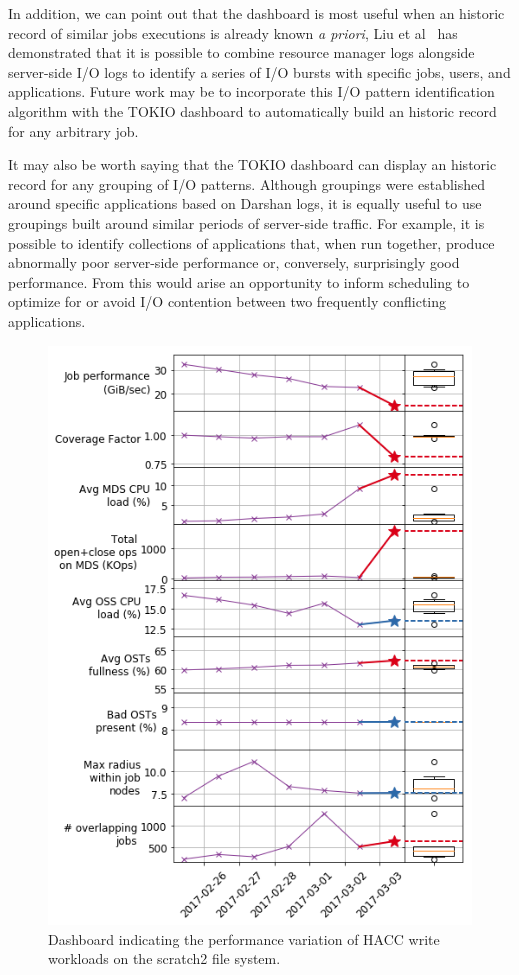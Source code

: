 \documentclass[conference,10pt,compsocconf]{IEEEtran}
\begin{document}
In addition, we can point out that the dashboard is most useful when an historic
record of similar jobs executions is already known \emph{a priori}, Liu et al~\cite{Liu2016}
has demonstrated that it is possible to combine resource manager logs alongside
server-side I/O logs to identify a series of I/O bursts with specific jobs,
users, and applications.  Future work may be to incorporate this I/O pattern
identification algorithm with the TOKIO dashboard to automatically build an
historic record for any arbitrary job.

It may also be worth saying that the TOKIO dashboard can display an historic
record for any grouping of I/O patterns.  Although groupings were established
around specific applications based on Darshan logs, it is equally useful to
use groupings built around similar periods of server-side traffic.  For example,
it is possible to identify collections of applications that, when run together,
produce abnormally poor server-side performance or, conversely, surprisingly
good performance.  From this would arise an opportunity to inform scheduling
to optimize for or avoid I/O contention between two frequently conflicting
applications.

\begin{figure}[t]
\centering
\includegraphics[width=1.0\columnwidth]{figs/edison-haccio-write-dashboard.png}
\caption{Dashboard indicating the performance variation of HACC write workloads
on the scratch2 file system.}
\label{fig:edison-haccio-write-dashboard}
\end{figure}
\end{document}
